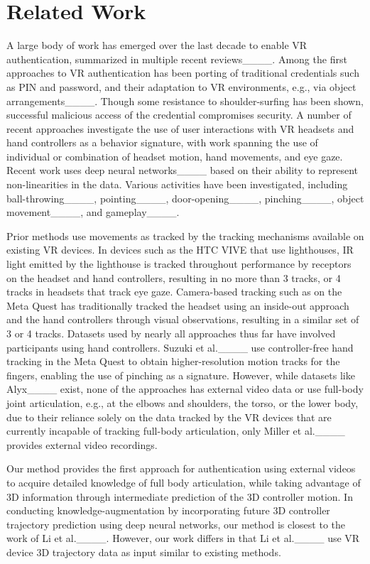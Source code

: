 \section{Related Work}
A large body of work has emerged over the last decade to enable VR authentication, summarized in multiple recent reviews____. Among the first approaches to VR authentication has been porting of traditional credentials such as PIN and password, and their adaptation to VR environments, e.g., via object arrangements____. Though some resistance to shoulder-surfing has been shown, successful malicious access of the credential compromises security. A number of recent approaches investigate the use of user interactions with VR headsets and hand controllers as a behavior signature, with work spanning the use of individual or combination of headset motion, hand movements, and eye gaze. Recent work uses deep neural networks____ based on their ability to represent non-linearities in the data. Various activities have been investigated, including ball-throwing____, pointing____, door-opening____, pinching____, object movement____, and gameplay____. 

Prior methods use movements as tracked by the tracking mechanisms available on existing VR devices. In devices such as the HTC VIVE that use lighthouses, IR light emitted by the lighthouse is tracked throughout performance by receptors on the headset and hand controllers, resulting in no more than 3 tracks, or 4 tracks in headsets that track eye gaze. Camera-based tracking such as on the Meta Quest has traditionally tracked the headset using an inside-out approach and the hand controllers through visual observations, resulting in a similar set of 3 or 4 tracks. Datasets used by nearly all approaches thus far have involved participants using hand controllers. Suzuki et al.____ use controller-free hand tracking in the Meta Quest to obtain higher-resolution motion tracks for the fingers, enabling the use of pinching as a signature. However, while datasets like Alyx____ exist, none of the approaches has external video data or use full-body joint articulation, e.g., at the elbows and shoulders, the torso, or the lower body, due to their reliance solely on the data tracked by the VR devices that are currently incapable of tracking full-body articulation, only Miller et al.____ provides external video recordings.

Our method provides the first approach for authentication using external videos to acquire detailed knowledge of full body articulation, while taking advantage of 3D information through intermediate prediction of the 3D controller motion. In conducting knowledge-augmentation by incorporating future 3D controller trajectory prediction using deep neural networks, our method is closest to the work of Li et al.____. However, our work differs in that Li et al.____ use VR device 3D trajectory data as input similar to existing methods.